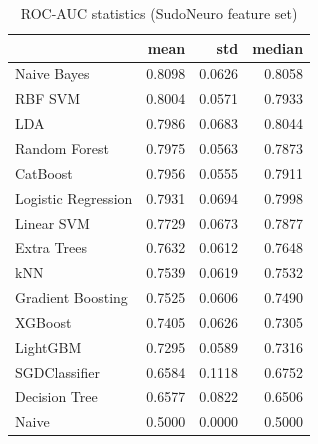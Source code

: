 \begin{table}
\caption{ROC-AUC statistics (SudoNeuro feature set)}
\label{tab:roc-auc_SudoNeuro_stats}
\begin{tabular}{lrrr}
\toprule
 & mean & std & median \\
\midrule
Naive Bayes & 0.8098 & 0.0626 & 0.8058 \\
RBF SVM & 0.8004 & 0.0571 & 0.7933 \\
LDA & 0.7986 & 0.0683 & 0.8044 \\
Random Forest & 0.7975 & 0.0563 & 0.7873 \\
CatBoost & 0.7956 & 0.0555 & 0.7911 \\
Logistic Regression & 0.7931 & 0.0694 & 0.7998 \\
Linear SVM & 0.7729 & 0.0673 & 0.7877 \\
Extra Trees & 0.7632 & 0.0612 & 0.7648 \\
kNN & 0.7539 & 0.0619 & 0.7532 \\
Gradient Boosting & 0.7525 & 0.0606 & 0.7490 \\
XGBoost & 0.7405 & 0.0626 & 0.7305 \\
LightGBM & 0.7295 & 0.0589 & 0.7316 \\
SGDClassifier & 0.6584 & 0.1118 & 0.6752 \\
Decision Tree & 0.6577 & 0.0822 & 0.6506 \\
Naive & 0.5000 & 0.0000 & 0.5000 \\
\bottomrule
\end{tabular}
\end{table}
